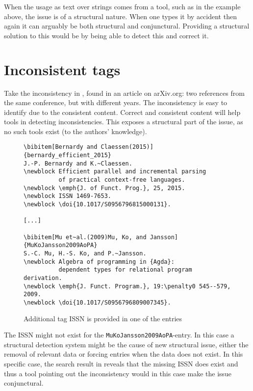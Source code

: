 When the usage as text over strings comes from a tool, such as in the
example above, the issue is of a structural nature.  When one types it
by accident then again it can arguably be both structural and
conjunctural.  Providing a structural solution to this would be by
being able to detect this and correct it.


\section{Inconsistent tags}
\label{sec:problems_inconsistent_tags}

Take the inconsistency in , found in an
article on arXiv.org: two references from the same conference, but
with different years.  The inconsistency is easy to identify due to
the consistent content.  Correct and consistent content will help
tools in detecting inconsistencies.  This exposes a structural part of
the issue, as no such tools exist (to the authors' knowledge).

\begin{figure}
  \centering
  \begin{small}
\begin{verbatim}
\bibitem[Bernardy and Claessen(2015)]{bernardy_efficient_2015}
J.-P. Bernardy and K.~Claessen.
\newblock Efficient parallel and incremental parsing
          of practical context-free languages.
\newblock \emph{J. of Funct. Prog.}, 25, 2015.
\newblock ISSN 1469-7653.
\newblock \doi{10.1017/S0956796815000131}.

[...]

\bibitem[Mu et~al.(2009)Mu, Ko, and Jansson]{MuKoJansson2009AoPA}
S.-C. Mu, H.-S. Ko, and P.~Jansson.
\newblock Algebra of programming in {Agda}:
          dependent types for relational program derivation.
\newblock \emph{J. Funct. Program.}, 19:\penalty0 545--579, 2009.
\newblock \doi{10.1017/S0956796809007345}.
\end{verbatim}
  \end{small}
  \caption{Additional tag ISSN is provided in one of the entries}
\label{fig:entry_with_issn}
\end{figure}

The ISSN might not exist for the \texttt{MuKoJansson2009AoPA}-entry.
In this case a structural detection system might be the cause of new
structural issue, either the removal of relevant data or forcing
entries when the data does not exist.  In this specific case, the
search result in  reveals that the
missing ISSN does exist and thus a tool pointing out the inconsistency
would in this case make the issue conjunctural.

